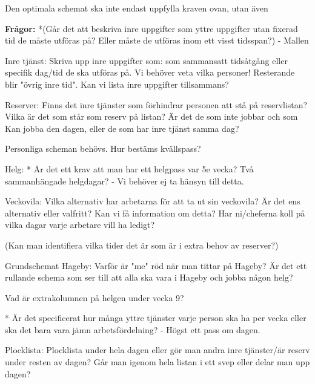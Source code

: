 Den optimala schemat ska inte endast uppfylla kraven ovan, utan även 

\textbf{Frågor:} 
*(Går det att beskriva inre uppgifter som yttre uppgifter utan fixerad tid de måste utföras på? Eller måste de utföras inom ett visst tidsspan?) - Mallen

Inre tjänst:
Skriva upp inre uppgifter som: som sammansatt tidsåtgång eller specifik dag/tid de ska utföras på. Vi behöver veta vilka personer! Resterande blir "övrig inre tid".
Kan vi lista inre uppgifter tillsammans?

Reserver:
Finns det inre tjänster som förhindrar personen att stå på reservlistan?
Vilka är det som står som reserv på listan? Är det de som inte jobbar och som Kan jobba den dagen, eller de som har inre tjänst samma dag?

Personliga scheman behövs. Hur bestäms kvällspass?

Helg:
* Är det ett krav att man har ett helgpass var 5e vecka? Två sammanhängade helgdagar? - Vi behöver ej ta hänsyn till detta.

Veckovila: 
Vilka alternativ har arbetarna för att ta ut sin veckovila? Är det ens alternativ eller valfritt? Kan vi få information om detta?
Har ni/cheferna koll på vilka dagar varje arbetare vill ha ledigt?


(Kan man identifiera vilka tider det är som är i extra behov av reserver?)

Grundschemat Hageby:
Varför är "me" röd när man tittar på Hageby? Är det ett rullande schema som ser till att alla ska vara i Hageby och jobba någon helg?

Vad är extrakolumnen på helgen under vecka 9?

* Är det specificerat hur många yttre tjänster varje person ska ha per vecka eller ska det bara vara jämn arbetsfördelning? - Högst ett pass om dagen.

Plocklista:
Plocklista under hela dagen eller gör man andra inre tjänster/är reserv under resten av dagen? Går man igenom hela listan i ett svep eller delar man upp dagen?


